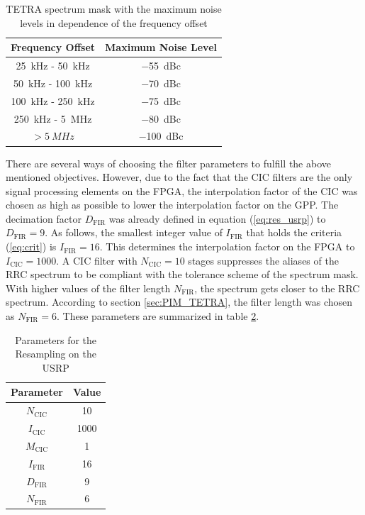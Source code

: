 \begin{table}[htb]
	\centering
		\begin{tabular}{c|c}
		\toprule
		Frequency Offset & Maximum Noise Level \\
		\midrule
		\SI{25}{kHz} - \SI{50}{kHz}  & \SI{-55}{dBc} \\
		\SI{50}{kHz} - \SI{100}{kHz}  & \SI{-70}{dBc} \\
		\SI{100}{kHz} - \SI{250}{kHz}  & \SI{-75}{dBc} \\
		\SI{250}{kHz} - \SI{5}{MHz}  & \SI{-80}{dBc} \\
		$> \SI{5}{MHz}$  & \SI{-100}{dBc} \\
		\bottomrule
		\end{tabular}
	\caption{TETRA spectrum mask with the maximum noise levels in dependence of the frequency offset}
	\label{tab:TETRASpectrumMask}
\end{table}

There are several ways of choosing the filter parameters to fulfill the above mentioned objectives. However, due to the fact that the CIC filters are the only signal processing elements on the FPGA, the interpolation factor of the CIC was chosen as high as possible to lower the interpolation factor on the GPP. The decimation factor $D_\text{FIR}$ was already defined in equation (\ref{eq:res_usrp}) to $D_\text{FIR}=9$. As follows, the smallest integer value of $I_\text{FIR}$ that holds the criteria (\ref{eq:crit}) is $I_\text{FIR}=16$. This determines the interpolation factor on the FPGA to $I_\text{CIC}=1000$. A CIC filter with $N_\text{CIC}=10$ stages suppresses the aliases of the RRC spectrum to be compliant with the tolerance scheme of the spectrum mask. With higher values of the filter length $N_\text{FIR}$, the spectrum gets closer to the RRC spectrum. According to section \ref{sec:PIM_TETRA}, the filter length was chosen as $N_\text{FIR}=6$. These parameters are summarized in table \ref{tab:usrp_res_par}. 


\begin{table}[htb]
	\centering
		\begin{tabular}{c|c}
		\toprule
		Parameter & Value \\
		\midrule
		$N_\text{CIC}$  & 10 \\
		$I_\text{CIC}$  & 1000 \\
		$M_\text{CIC}$  & 1 \\
		$I_\text{FIR}$  & 16 \\
		$D_\text{FIR}$  & 9 \\
		$N_\text{FIR}$  & 6 \\
		\bottomrule
		\end{tabular}
	\caption{Parameters for the Resampling on the USRP}
	\label{tab:usrp_res_par}
\end{table}

